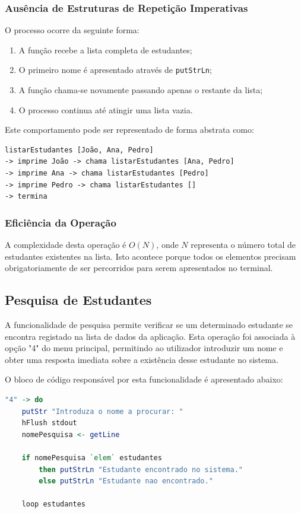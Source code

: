 \documentclass[12pt,a4paper]{article}
\begin{document}
\subsubsection*{Ausência de Estruturas de Repetição Imperativas}
O processo ocorre da seguinte forma:
\begin{enumerate}
    \item A função recebe a lista completa de estudantes;
    \item O primeiro nome é apresentado através de \texttt{putStrLn};
    \item A função chama-se novamente passando apenas o restante da lista;
    \item O processo continua até atingir uma lista vazia.
\end{enumerate}

Este comportamento pode ser representado de forma abstrata como:
\begin{verbatim}
listarEstudantes [João, Ana, Pedro]
-> imprime João -> chama listarEstudantes [Ana, Pedro]
-> imprime Ana -> chama listarEstudantes [Pedro]
-> imprime Pedro -> chama listarEstudantes []
-> termina
\end{verbatim}

\subsubsection*{Eficiência da Operação}
A complexidade desta operação é $O(N)$, onde $N$ representa o número total de estudantes existentes na lista. Isto acontece porque todos os elementos precisam obrigatoriamente de ser percorridos para serem apresentados no terminal.

\subsection{Pesquisa de Estudantes}
A funcionalidade de pesquisa permite verificar se um determinado estudante se encontra registado na lista de dados da aplicação. Esta operação foi associada à opção "4" do menu principal, permitindo ao utilizador introduzir um nome e obter uma resposta imediata sobre a existência desse estudante no sistema.

O bloco de código responsável por esta funcionalidade é apresentado abaixo:
\begin{lstlisting}[language=Haskell]
"4" -> do
    putStr "Introduza o nome a procurar: "
    hFlush stdout
    nomePesquisa <- getLine

    if nomePesquisa `elem` estudantes
        then putStrLn "Estudante encontrado no sistema."
        else putStrLn "Estudante nao encontrado."

    loop estudantes
\end{lstlisting}
\end{document}
